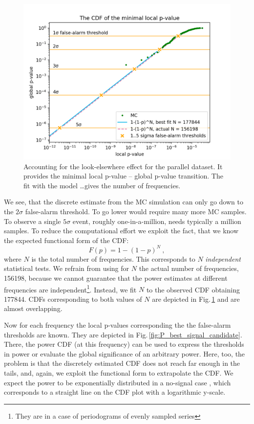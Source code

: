 \begin{figure}
  \centering
  \includegraphics[width=0.9\linewidth]{gfx/axions/P_look-elsewhere.png}
  \caption{Accounting for the look-elsewhere effect for the parallel dataset. It provides the minimal local p-value -- global p-value transition. The fit with the model \dots gives the number of frequencies.}
  \label{fig:P_look-elsewhere}
\end{figure}

We see, that the discrete estimate from the MC simulation can only go down to the $2\sigma$ false-alarm threshold. To go lower would require many more MC samples. To observe a single $5\sigma$ event, roughly one-in-a-million, needs typically a million samples. To reduce the computational effort we exploit the fact, that we know the expected functional form of the CDF:
\begin{equation}
  F(p) = 1 - (1-p)^N\ ,
\end{equation}
where $N$ is the total number of frequencies. This corresponds to $N$ \emph{independent} statistical tests. We refrain from using for $N$ the actual number of frequencies, \num{156198}, because we cannot guarantee that the power estimates at different frequencies are independent\footnote{They are in a case of periodograms of evenly sampled series}. Instead, we fit $N$ to the observed CDF obtaining \num{177844}. CDFs corresponding to both values of $N$ are depicted in Fig.\,\ref{fig:P_look-elsewhere} and are almost overlapping.

Now for each frequency the local p-values corresponding the the false-alarm thresholds are known. They are depicted in Fig.\,\ref{fig:P_best_signal_candidate}. There, the power CDF (at this frequency) can be used to express the thresholds in power or evaluate the global significance of an arbitrary power. Here, too, the problem is that the discretely estimated CDF does not reach far enough in the tails, and, again, we exploit the functional form to extrapolate the CDF. We expect the power to be exponentially distributed in a no-signal case \cite{Scargle1982}, which corresponds to a straight line on the CDF plot with a logarithmic y-scale.

